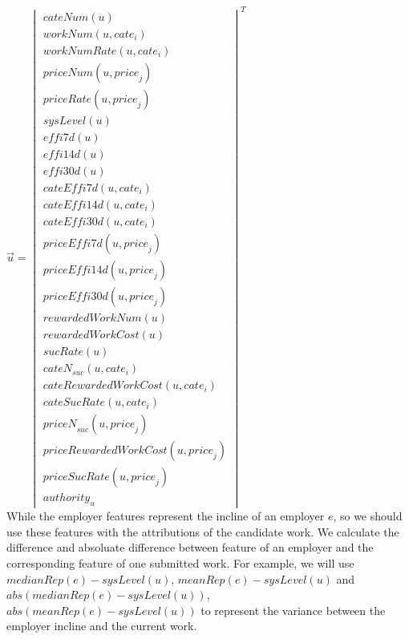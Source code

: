 $\vec{u}={\begin{vmatrix} 
cateNum(u)\\
workNum(u,{cate}_{i})\\
workNumRate(u,{cate}_{i})\\
priceNum(u,{price}_{j})\\
priceRate(u,{price}_{j})\\
sysLevel(u)\\
effi7d(u)\\
effi14d(u)\\
effi30d(u)\\
cateEffi7d(u,{cate}_{i})\\
cateEffi14d(u,{cate}_{i})\\
cateEffi30d(u,{cate}_{i})\\
priceEffi7d(u,{price}_{j})\\
priceEffi14d(u,{price}_{j})\\
priceEffi30d(u,{price}_{j})\\
rewardedWorkNum(u)\\
rewardedWorkCost(u)\\
sucRate(u)\\
{cateN}_{suc}(u,{cate}_{i})\\
cateRewardedWorkCost(u,{cate}_{i})\\%
cateSucRate(u,{cate}_{i})\\
{priceN}_{suc}(u,{price}_{j})\\
priceRewardedWorkCost(u,{price}_{j})\\%
priceSucRate(u,{price}_{j})\\
{authority}_{u}
\end{vmatrix} }^{ T }$\\
While the employer features represent the incline of an employer $e$, so we should use these features with the attributions of the candidate work. We calculate the difference and absoluate difference between feature of an employer and the corresponding feature of one submitted work. For example, we will use $medianRep(e)-sysLevel(u)$, $meanRep(e)-sysLevel(u)$ and $abs(medianRep(e)-sysLevel(u))$, \\ $abs(meanRep(e)-sysLevel(u))$ to represent the variance between the employer incline and the current work.\\
